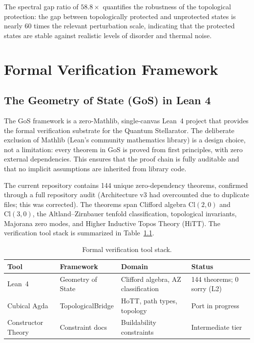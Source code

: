 \documentclass[12pt,letterpaper]{report}
\begin{document}
The spectral gap ratio of $58.8\times$ quantifies the robustness of the topological protection: the gap between topologically protected and unprotected states is nearly 60 times the relevant perturbation scale, indicating that the protected states are stable against realistic levels of disorder and thermal noise.



\chapter{Formal Verification Framework}

\section{The Geometry of State (GoS) in Lean 4}

The GoS framework is a zero-Mathlib, single-canvas Lean~4 project that provides the formal verification substrate for the Quantum Stellarator. The deliberate exclusion of Mathlib (Lean's community mathematics library) is a design choice, not a limitation: every theorem in GoS is proved from first principles, with zero external dependencies. This ensures that the proof chain is fully auditable and that no implicit assumptions are inherited from library code.

The current repository contains 144 unique zero-dependency theorems, confirmed through a full repository audit (Architecture v3 had overcounted due to duplicate files; this was corrected). The theorems span Clifford algebra $\mathrm{Cl}(2,0)$ and $\mathrm{Cl}(3,0)$, the Altland--Zirnbauer tenfold classification, topological invariants, Majorana zero modes, and Higher Inductive Topos Theory (HiTT). The verification tool stack is summarized in Table~\ref{tab:verification}.

\begin{table}[ht]
\centering
\caption{Formal verification tool stack.}
\label{tab:verification}
\small
\begin{tabularx}{\textwidth}{l l X l}
\toprule
\textbf{Tool} & \textbf{Framework} & \textbf{Domain} & \textbf{Status} \\
\midrule
\rowcolor{proved}
Lean~4 & Geometry of State & Clifford algebra, AZ classification & 144 theorems; 0 sorry (L2) \\
\rowcolor{demonstrated}
Cubical Agda & TopologicalBridge & HoTT, path types, topology & Port in progress \\
\rowcolor{motivated}
Constructor Theory & Constraint docs & Buildability constraints & Intermediate tier \\
\bottomrule
\end{tabularx}
\end{table}
\end{document}
